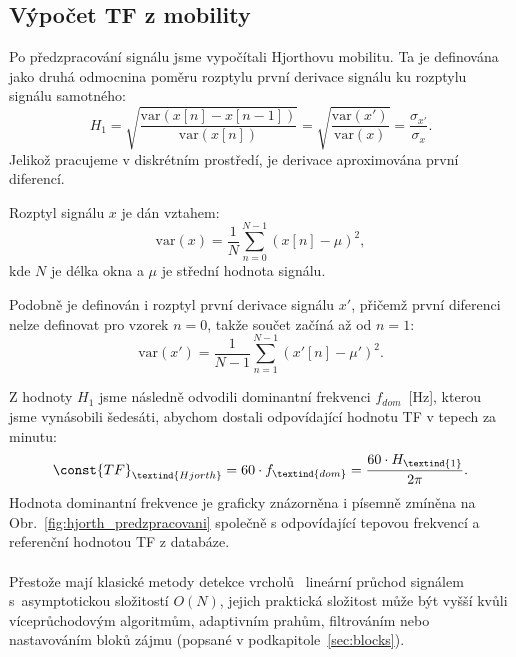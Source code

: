 \subsection*{Výpočet TF z mobility}
\label{sec:TF_mobilita}
Po předzpracování signálu jsme vypočítali Hjorthovu mobilitu.
Ta je definována~\cite{Hjorth1970,Geetika2022} jako druhá odmocnina poměru rozptylu první derivace signálu ku rozptylu signálu samotného:
\begin{equation}
	\label{eq:hjorth_mobility}
	H_1 = \sqrt{ \frac{ \mathrm{var}(x[n] - x[n-1]) }{ \mathrm{var}(x[n]) } }
	= \sqrt{ \frac{ \mathrm{var}(x') }{ \mathrm{var}(x) } }
	= \frac{ \sigma_{x'} }{ \sigma_{x} }.
\end{equation}
Jelikož pracujeme v diskrétním prostředí, je derivace aproximována první diferencí.

Rozptyl signálu \( x \) je dán vztahem:
\begin{equation}
	\label{eq:hjorth_var_signal}
	\mathrm{var}(x) = \frac{1}{N} \sum_{n=0}^{N-1} (x[n] - \mu)^2,
\end{equation}
kde \( N \) je délka okna a \( \mu \) je střední hodnota signálu.

Podobně je definován i rozptyl první derivace signálu \( x' \), přičemž první diferenci nelze definovat pro vzorek \( n = 0 \), takže součet začíná až od \( n = 1 \):
\begin{equation}
	\label{eq:hjorth_var_signal_diff}
	\mathrm{var}(x') = \frac{1}{N - 1} \sum_{n=1}^{N-1} (x'[n] - \mu')^2.
\end{equation}

Z hodnoty \( H_1 \) jsme následně odvodili dominantní frekvenci \( f_{dom} \)~[Hz], kterou jsme vynásobili šedesáti, abychom dostali odpovídající hodnotu \acs{TF} v tepech za minutu:
\begin{equation}
	\const{TF}_{\textind{Hjorth}} = 60 \cdot f_{\textind{dom}} = \frac{60 \cdot H_{\textind{1}}}{2\pi}.
\end{equation}
Hodnota dominantní frekvence je graficky znázorněna i písemně zmíněna na Obr.~\ref{fig:hjorth_predzpracovani} společně s odpovídající tepovou frekvencí a referenční hodnotou \acs{TF} z databáze.

\paragraph{}
Přestože mají klasické metody detekce vrcholů~\cite{Elgendi2013} lineární průchod signálem s~asymptotickou složitostí \( O(N) \), jejich praktická složitost může být vyšší kvůli víceprůchodovým algoritmům, adaptivním prahům, filtrováním nebo nastavováním bloků zájmu (popsané v podkapitole~\ref{sec:blocks}).

